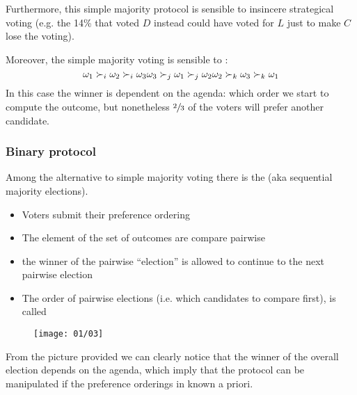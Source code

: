 Furthermore, this simple majority protocol is sensible to insincere strategical voting (e.g. the 14\% that voted $D$ instead could have voted for $L$ just to make $C$ lose the voting).

Moreover, the simple majority voting is sensible to :
\begin{equation*}
\omega_1 \succ_i \omega_2 \succ_i \omega_3\\
\omega_3 \succ_j \omega_1 \succ_j \omega_2\\
\omega_2 \succ_k \omega_3 \succ_k \omega_1\\
\end{equation*}
In this case the winner is dependent on the agenda: which order we start to compute the outcome, but nonetheless $\sfrac{2}{3}$ of the voters will prefer another candidate.

\subsubsection{Binary protocol}
Among the alternative to simple majority voting there is the  (aka sequential majority elections).

\begin{itemize}
\item Voters submit their preference ordering
\item The element of the set of outcomes are compare pairwise
\item the winner of the pairwise ``election'' is allowed to continue to the next pairwise election
\item The order of pairwise elections (i.e. which candidates to compare first), is called 
\end{itemize}

\begin{figure}[!h]
\centering
\texttt{[image: 01/03]}
\end{figure}


From the picture provided we can clearly notice that the winner of the overall election depends on the agenda, which imply that the protocol can be manipulated if the preference orderings in known a priori.

